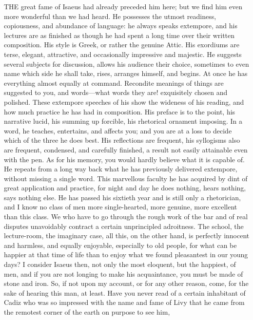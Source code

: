 THE great fame of Isaeus had already preceded him here; but we find him
even more wonderful than we had heard. He possesses the utmost readiness,
copiousness, and abundance of language: he always speaks extempore, and
his lectures are as finished as though he had spent a long time over their
written composition. His style is Greek, or rather the genuine Attic. His
exordiums are terse, elegant, attractive, and occasionally impressive and
majestic. He suggests several subjects for discussion, allows his audience
their choice, sometimes to even name which side he shall take, rises,
arranges himself, and begins. At once he has everything almost equally at
command. Recondite meanings of things are suggested to you, and words—what
words they are! exquisitely chosen and polished. These extempore speeches
of his show the wideness of his reading, and how much practice he has had
in composition. His preface is to the point, his narrative lucid, his
summing up forcible, his rhetorical ornament imposing. In a word, he
teaches, entertains, and affects you; and you are at a loss to decide
which of the three he does best. His reflections are frequent, his
syllogisms also are frequent, condensed, and carefully finished, a result
not easily attainable even with the pen. As for his memory, you would
hardly believe what it is capable of. He repeats from a long way back what
he has previously delivered extempore, without missing a single word. This
marvellous faculty he has acquired by dint of great application and
practice, for night and day he does nothing, hears nothing, says nothing
else. He has passed his sixtieth year and is still only a rhetorician, and
I know no class of men more single-hearted, more genuine, more excellent
than this class. We who have to go through the rough work of the bar and
of real disputes unavoidably contract a certain unprincipled adroitness.
The school, the lecture-room, the imaginary case, all this, on the other
hand, is perfectly innocent and harmless, and equally enjoyable,
especially to old people, for what can be happier at that time of life
than to enjoy what we found pleasantest in our young days? I consider
Isaeus then, not only the most eloquent, but the happiest, of men, and if
you are not longing to make his acquaintance, you must be made of stone
and iron. So, if not upon my account, or for any other reason, come, for
the sake of hearing this man, at least. Have you never read of a certain
inhabitant of Cadiz who was so impressed with the name and fame of Livy
that he came from the remotest corner of the earth on purpose to see him,
